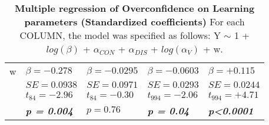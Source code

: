 \begin{table}
\begin{tabular}{r|llll}
\hline w&$\beta=-0.278$&$\beta=-0.0295$&$\beta=-0.0603$&$\beta=+0.115$\\
&$SE=0.0938$&$SE=0.0971$&$SE=0.0293$&$SE=0.0244$\\
&$t_{84}=-2.96$&$t_{84}=-0.30$&$t_{994}=-2.06$&$t_{994}=+4.71$\\
&\textbf{\textit{p = 0.004}}&$p=0.76$&\textbf{\textit{p = 0.04}}&\textbf{\textit{p\textless0.0001}}\\
\hline \hline
\end{tabular}
\caption{\textbf{Multiple regression of Overconfidence on Learning parameters (Standardized coefficients)} For each COLUMN, the model was specified as follows: Y $\sim$ 1 + $log(\beta)$ + $\alpha_{CON}$ + $\alpha_{DIS}$ + $log(\alpha_V)$ + w.}
\label{tab:Multiple regressionOverconfidence}
\end{table}
% 
% 
